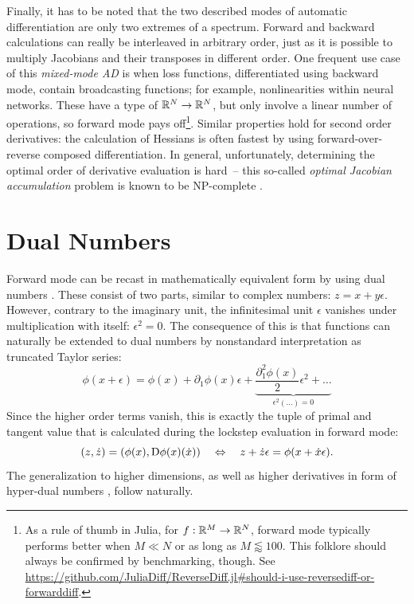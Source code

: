 Finally, it has to be noted that the two described modes of automatic differentiation are only two
extremes of a spectrum.  Forward and backward calculations can really be interleaved in arbitrary
order, just as it is possible to multiply Jacobians and their transposes in different order.  One
frequent use case of this \emph{mixed-mode AD} is when loss functions, differentiated using backward
mode, contain broadcasting functions; for example, nonlinearities within neural networks.  These
have a type of \(\mathbb{R}^N \to \mathbb{R}^N\), but only involve a linear number of operations, so forward mode
pays off\footnote{As a rule of thumb in Julia, for \(f: \mathbb{R}^M \to \mathbb{R}^N\), forward mode typically
  performs better when \(M \ll N\) or as long as \(M \lessapprox 100\).  This folklore should always
  be confirmed by benchmarking, though.  See
  \url{https://github.com/JuliaDiff/ReverseDiff.jl\#should-i-use-reversediff-or-forwarddiff}.}.
Similar properties hold for second order derivatives: the calculation of Hessians is often fastest
by using forward-over-reverse composed differentiation.  In general, unfortunately, determining the
optimal order of derivative evaluation is hard~-- this so-called \emph{optimal Jacobian
  accumulation} problem is known to be NP-complete \parencite{naumann2007optimal}.

\section{Dual Numbers}
\label{sec:dual-numbers}

Forward mode can be recast in mathematically equivalent form by using dual numbers
\parencites[see][section 3.1.1]{baydin2018automatic}{deakin1966functions}.  These consist of two
parts, similar to complex numbers: \(z = x + y\epsilon\).  However, contrary to the imaginary unit,
the infinitesimal unit \(\epsilon\) vanishes under multiplication with itself: \(\epsilon^2 = 0\).
The consequence of this is that functions can naturally be extended to dual numbers by nonstandard
interpretation as truncated Taylor series:
\begin{equation}
  \phi(x + \epsilon) = \phi(x) + \partial_1\phi(x)\epsilon + \underbrace{\frac{\partial^2_1\phi(x)}{2}\epsilon^2
  + \ldots}_{\epsilon^2 (\ldots) = 0}
\end{equation}
Since the higher order terms vanish, this is exactly the tuple of primal and tangent value that is
calculated during the lockstep evaluation in forward mode:
\begin{equation}
  (z, \dot{z}) = (\phi(x), \mathop{}\!\mathrm{D}\phi(x)(\dot{x})) \quad\Leftrightarrow\quad z + \dot{z}\epsilon = \phi(x + \dot{x}\epsilon).
\end{equation}
The generalization to higher dimensions, as well as higher derivatives in form of hyper-dual numbers
\parencite{fike2012automatic}, follow naturally.





